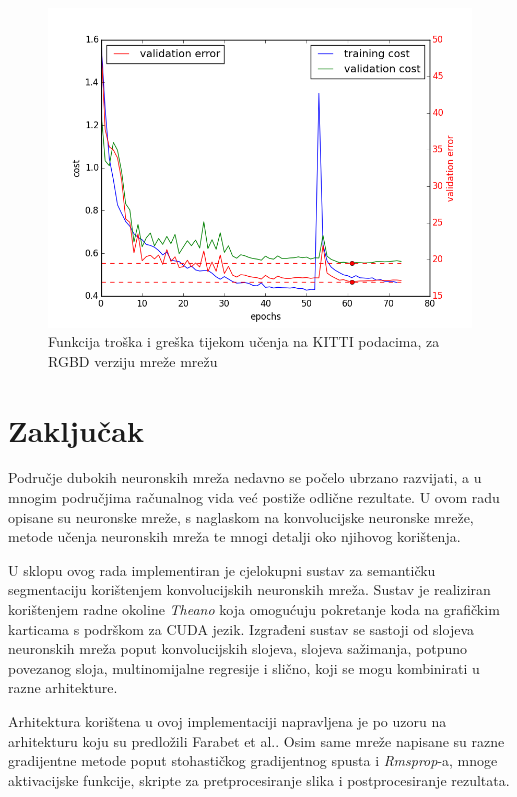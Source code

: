 \documentclass[times, utf8, diplomski, numeric]{fer}
\begin{document}
\begin{figure}[htb]
  \centering
  \includegraphics[width=\textwidth]{imgs/cost-kitti-rgbd.png}
  \caption{Funkcija troška i greška tijekom učenja na KITTI podacima, za RGBD verziju mreže mrežu}
  \label{fig:kitti_train}
\end{figure}

\chapter{Zaključak}

Područje dubokih neuronskih mreža nedavno se počelo ubrzano razvijati, a u mnogim područjima računalnog vida već postiže odlične rezultate. U ovom radu opisane su neuronske mreže, s naglaskom na konvolucijske neuronske mreže, metode učenja neuronskih mreža te mnogi detalji oko njihovog korištenja.

U sklopu ovog rada implementiran je cjelokupni sustav za semantičku segmentaciju korištenjem konvolucijskih neuronskih mreža. Sustav je realiziran korištenjem radne okoline \textit{Theano} koja omogućuju pokretanje koda na grafičkim karticama s podrškom za CUDA jezik. Izgrađeni sustav se sastoji od slojeva neuronskih mreža poput konvolucijskih slojeva, slojeva sažimanja, potpuno povezanog sloja, multinomijalne regresije i slično, koji se mogu kombinirati u razne arhitekture.

Arhitektura korištena u ovoj implementaciji napravljena je po uzoru na arhitekturu koju su predložili Farabet et al.\cite{farabet_pami}. Osim same mreže napisane su razne gradijentne metode poput stohastičkog gradijentnog spusta i \textit{Rmsprop}-a, mnoge aktivacijske funkcije, skripte za pretprocesiranje slika i postprocesiranje rezultata.
\end{document}
